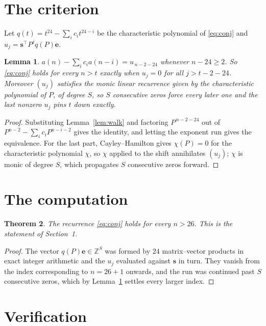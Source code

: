 \documentclass[11pt,a4paper]{article}
\theoremstyle{plain}
\newtheorem{theorem}{Theorem}
\newtheorem{lemma}[theorem]{Lemma}
\theoremstyle{definition}
\begin{document}
\section{The criterion}

Let $q(t)=t^{24}-\sum_i c_i t^{24-i}$ be the characteristic polynomial of
\eqref{eq:conj} and $u_j=\mathbf{s}^{\!\top}P^{j}q(P)\mathbf{e}$.

\begin{lemma}\label{lem:crit}
$a(n)-\sum_i c_i a(n-i)=u_{\,n-2-24}$ whenever $n-24\ge2$. So \eqref{eq:conj}
holds for every $n>t$ exactly when $u_j=0$ for all $j>t-2-24$. Moreover $(u_j)$
satisfies the monic linear recurrence given by the characteristic polynomial of $P$, of
degree $S$, so $S$ consecutive zeros force every later one and the last nonzero $u_j$ pins
$t$ down exactly.
\end{lemma}

\begin{proof}
Substituting Lemma~\ref{lem:walk} and factoring $P^{\,n-2-24}$ out of
$P^{n-2}-\sum_i c_i P^{n-i-2}$ gives the identity, and letting the exponent run gives the
equivalence. For the last part, Cayley--Hamilton gives $\chi(P)=0$ for the characteristic
polynomial $\chi$, so $\chi$ applied to the shift annihilates $(u_j)$; $\chi$ is monic of
degree $S$, which propagates $S$ consecutive zeros forward.
\end{proof}

\section{The computation}

\begin{theorem}
The recurrence \eqref{eq:conj} holds for every $n>26$. This is the statement of
Section~1.
\end{theorem}

\begin{proof}
The vector $q(P)\mathbf{e}\in\mathbb{Z}^{S}$ was formed by $24$ matrix--vector
products in exact integer arithmetic and the $u_j$ evaluated against $\mathbf{s}$ in turn.
They vanish from the index corresponding to $n=26+1$ onwards, and the run was continued
past $S$ consecutive zeros, which by Lemma~\ref{lem:crit} settles every larger index.
\end{proof}

\section{Verification}
\end{document}
